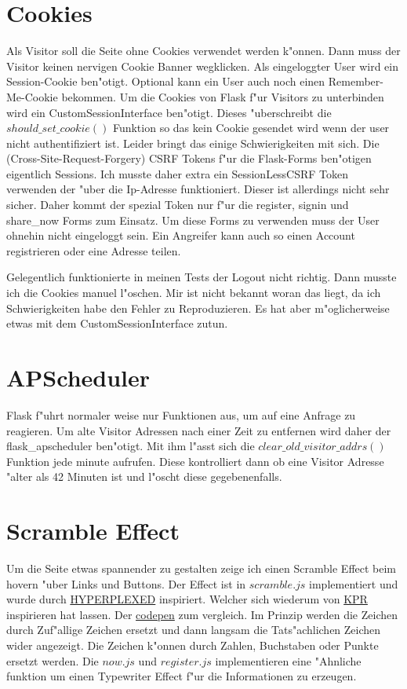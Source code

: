 \section{Cookies}\label{sec:cookies}
Als Visitor soll die Seite ohne Cookies verwendet werden k{"o}nnen.
Dann muss der Visitor keinen nervigen Cookie Banner wegklicken.
Als eingeloggter User wird ein Session-Cookie ben{"o}tigt.
Optional kann ein User auch noch einen Remember-Me-Cookie bekommen.
Um die Cookies von Flask f{"u}r Visitors zu unterbinden wird ein CustomSessionInterface ben{"o}tigt.
Dieses {"u}berschreibt die $should\_set\_cookie()$ Funktion so das kein Cookie gesendet wird wenn der user nicht authentifiziert ist.
Leider bringt das einige Schwierigkeiten mit sich.
Die (Cross-Site-Request-Forgery) CSRF Tokens f{"u}r die Flask-Forms ben{"o}tigen eigentlich Sessions.
Ich musste daher extra ein SessionLessCSRF Token verwenden der {"u}ber die Ip-Adresse funktioniert.
Dieser ist allerdings nicht sehr sicher.
Daher kommt der spezial Token nur f{"u}r die register, signin und share\_now Forms zum Einsatz.
Um diese Forms zu verwenden muss der User ohnehin nicht eingeloggt sein.
Ein Angreifer kann auch so einen Account registrieren oder eine Adresse teilen.

Gelegentlich funktionierte in meinen Tests der Logout nicht richtig.
Dann musste ich die Cookies manuel l{"o}schen.
Mir ist nicht bekannt woran das liegt, da ich Schwierigkeiten habe den Fehler zu Reproduzieren.
Es hat aber m{"o}glicherweise etwas mit dem CustomSessionInterface zutun.

\section{APScheduler}\label{sec:ap_scheduler}
Flask f{"u}hrt normaler weise nur Funktionen aus, um auf eine Anfrage zu reagieren.
Um alte Visitor Adressen nach einer Zeit zu entfernen wird daher der flask\_apscheduler ben{"o}tigt.
Mit ihm l{"a}sst sich die $clear\_old\_visitor\_addrs()$ Funktion jede minute aufrufen.
Diese kontrolliert dann ob eine Visitor Adresse {"a}lter als 42 Minuten ist und l{"o}scht diese gegebenenfalls.

\section{Scramble Effect}\label{sec:scramble-effect}
Um die Seite etwas spannender zu gestalten zeige ich einen Scramble Effect beim hovern {"u}ber Links und Buttons.
Der Effect ist in $scramble.js$ implementiert und wurde durch \href{https://youtu.be/W5oawMJaXbU}{HYPERPLEXED} inspiriert.
Welcher sich wiederum von \href{https://kprverse.com}{KPR} inspirieren hat lassen.
Der \href{https://codepen.io/Hyperplexed/pen/rNrJgrd'}{codepen} zum vergleich.
Im Prinzip werden die Zeichen durch Zuf{"a}llige Zeichen ersetzt und dann langsam die Tats{"a}chlichen Zeichen wider angezeigt.
Die Zeichen k{"o}nnen durch Zahlen, Buchstaben oder Punkte ersetzt werden.
Die $now.js$ und $register.js$ implementieren eine {"A}hnliche funktion um einen Typewriter Effect f{"u}r die Informationen zu erzeugen.

